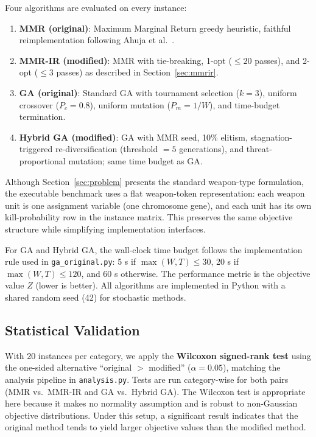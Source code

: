 \documentclass[10pt,conference]{IEEEtran}
\begin{document}
Four algorithms are evaluated on every instance:

\begin{enumerate}
  \item \textbf{MMR (original)}: Maximum Marginal Return greedy heuristic,
    faithful reimplementation following Ahuja et al.\ \cite{ahuja2007}.
  \item \textbf{MMR-IR (modified)}: MMR with tie-breaking, 1-opt ($\leq 20$
        passes), and 2-opt ($\leq 3$ passes) as described in
        Section~\ref{sec:mmrir}.
  \item \textbf{GA (original)}: Standard GA with tournament selection
        ($k=3$), uniform crossover ($P_c = 0.8$), uniform mutation
        ($P_m = 1/W$), and time-budget termination.
  \item \textbf{Hybrid GA (modified)}: GA with MMR seed, 10\% elitism,
        stagnation-triggered re-diversification (threshold $= 5$ generations), and
        threat-proportional mutation; same time budget as GA.
\end{enumerate}

Although Section~\ref{sec:problem} presents the standard weapon-type
formulation, the executable benchmark uses a flat weapon-token representation:
each weapon unit is one assignment variable (one chromosome gene), and each
unit has its own kill-probability row in the instance matrix.  This preserves
the same objective structure while simplifying implementation interfaces.

For GA and Hybrid GA, the wall-clock time budget follows the implementation
rule used in \texttt{ga\_original.py}: 5 s if $\max(W,T) \leq 30$, 20 s if
$\max(W,T) \leq 120$, and 60 s otherwise.
The performance metric is the objective value $Z$ (lower is better).
All algorithms are implemented in Python with a shared random seed (42) for
stochastic methods.

\subsection{Statistical Validation}

With 20 instances per category, we apply the \textbf{Wilcoxon signed-rank
test} using the one-sided alternative ``original $>$ modified''
($\alpha = 0.05$), matching the analysis pipeline in \texttt{analysis.py}.
Tests are run category-wise for both pairs (MMR vs.\ MMR-IR and
GA vs.\ Hybrid GA).  The Wilcoxon test is appropriate here because it makes
no normality assumption and is robust to non-Gaussian objective distributions.
Under this setup, a significant result indicates that the original method tends
to yield larger objective values than the modified method.
\end{document}
